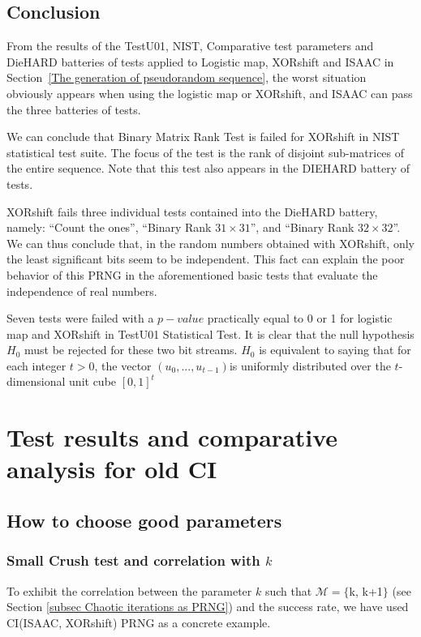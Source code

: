 \subsection{Conclusion}
From the results of the TestU01, NIST, Comparative test parameters and DieHARD batteries of tests applied to Logistic map, XORshift and ISAAC in Section~\ref{The generation of pseudorandom sequence}, the worst situation obviously appears when using the logistic map or XORshift, and  ISAAC can pass the three batteries of tests.

We can conclude that Binary Matrix Rank Test is failed for XORshift in NIST statistical test suite. The focus of the test is the rank of disjoint sub-matrices of the entire sequence. Note that this test also appears in the DIEHARD battery of tests.

XORshift fails three individual tests contained into the DieHARD battery, namely: ``Count the ones'', ``Binary Rank $31 \times 31$'', and ``Binary Rank $32 \times 32$''. 
We can thus conclude that, in the random numbers obtained with XORshift, only the least significant bits seem to be independent. This fact can explain the poor behavior of this PRNG in the aforementioned basic tests that evaluate the independence of real numbers. 


Seven tests were failed with a $p-value$ practically equal to 0 or 1 for logistic map and XORshift in TestU01 Statistical Test. It is clear that the null hypothesis $H_0$ must be rejected for these two bit streams. $H_0$ is equivalent to saying that for each integer $t>0$, the vector $(u_0 , . . . , u_{t-1} ) $is uniformly distributed over the $t$-dimensional unit cube $[0, 1]^t$



\section{Test results and comparative analysis for old CI}
\label{Test results and comparative analysis}

\subsection{How to choose good parameters}

\subsubsection{Small Crush test and correlation with $k$}

To exhibit the correlation between the parameter $k$ such that $\mathcal{M}=\{$k, k+1$\}$ (see Section \ref{subsec Chaotic iterations as PRNG}) and the success rate, we have used CI(ISAAC, XORshift) PRNG as a concrete example. 

